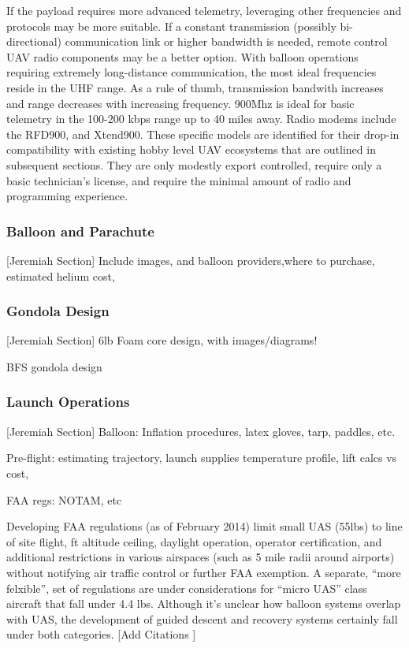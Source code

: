 \documentclass[heading.tex]{subfiles}
\begin{document}
If the payload requires more advanced telemetry, leveraging other frequencies
and protocols may be more suitable. If a constant transmission
(possibly bi-directional) communication link or higher bandwidth is needed,
remote control UAV radio components may be a better option. With balloon
operations requiring extremely long-distance communication, the most ideal
frequencies reside in the UHF range. As a rule of thumb, transmission bandwith
increases and range decreases with increasing frequency. 900Mhz is ideal for
basic telemetry in the 100-200 kbps range up to 40 miles away. Radio modems
include the RFD900, and Xtend900. These specific models are identified for their
drop-in compatibility with existing hobby level UAV ecosystems that are outlined
in subsequent sections. They are only modestly export controlled, require only
a basic technician's license, and require the minimal amount of radio and 
programming experience.

\subsubsection{Balloon and Parachute}

[Jeremiah Section]
Include images, and balloon providers,where to purchase, estimated helium cost,

\subsubsection{Gondola Design}

[Jeremiah Section]
\<6lb Foam core design, with images/diagrams!

BFS gondola design

\subsubsection{Launch Operations}

[Jeremiah Section]
Balloon: Inflation procedures, latex gloves, tarp, paddles, etc.

Pre-flight: estimating trajectory, launch supplies
temperature profile, lift calcs vs cost, 

FAA regs: NOTAM, etc

Developing FAA regulations (as of February 2014) limit small UAS (\<55lbs) to
line of site flight,  ft altitude ceiling, daylight operation, operator certification,
and additional restrictions in various airspaces (such as 5 mile radii around airports)
without notifying air traffic control or further FAA exemption.
A separate, ``more felxible'', set of regulations are under considerations
for ``micro UAS'' class aircraft that fall under 4.4 lbs.
Although it's unclear how balloon systems overlap with UAS, the development
of guided descent and recovery systems certainly fall under both categories.
[Add Citations \cite{FAAuav}]
\end{document}
